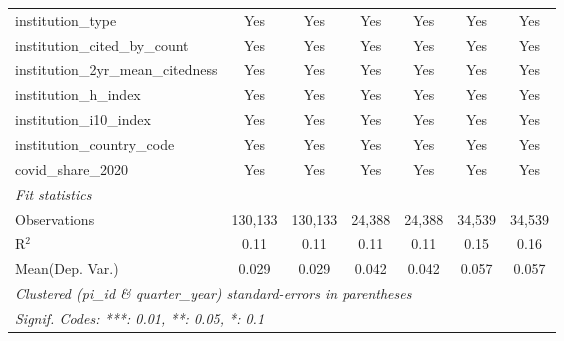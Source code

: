 \begin{tabular}{lcccccc}
   institution\_type                                           & Yes            & Yes            & Yes            & Yes            & Yes            & Yes\\  
   institution\_cited\_by\_count                               & Yes            & Yes            & Yes            & Yes            & Yes            & Yes\\  
   institution\_2yr\_mean\_citedness                           & Yes            & Yes            & Yes            & Yes            & Yes            & Yes\\  
   institution\_h\_index                                       & Yes            & Yes            & Yes            & Yes            & Yes            & Yes\\  
   institution\_i10\_index                                     & Yes            & Yes            & Yes            & Yes            & Yes            & Yes\\  
   institution\_country\_code                                  & Yes            & Yes            & Yes            & Yes            & Yes            & Yes\\  
   covid\_share\_2020                                          & Yes            & Yes            & Yes            & Yes            & Yes            & Yes\\  
   \midrule
   \emph{Fit statistics}\\
   Observations                                                & 130,133        & 130,133        & 24,388         & 24,388         & 34,539         & 34,539\\  
   R$^2$                                                       & 0.11           & 0.11           & 0.11           & 0.11           & 0.15           & 0.16\\  
Mean(Dep. Var.) & 0.029 & 0.029 & 0.042 & 0.042 & 0.057 & 0.057 \\
   \midrule \midrule
   \multicolumn{7}{l}{\emph{Clustered (pi\_id \& quarter\_year) standard-errors in parentheses}}\\
   \multicolumn{7}{l}{\emph{Signif. Codes: ***: 0.01, **: 0.05, *: 0.1}}\\
\end{tabular}
\par\endgroup
